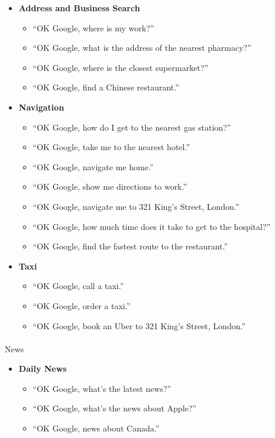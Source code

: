 \documentclass[
  a4paper,
]{article}
\makeatletter
\let\oldparagraph\paragraph
\renewcommand{\paragraph}{
    \@ifstar
      \xxxParagraphStar
      \xxxParagraphNoStar
  }
\newcommand{\xxxParagraphStar}[1]{\oldparagraph*{#1}\mbox{}}
\newcommand{\xxxParagraphNoStar}[1]{\oldparagraph{#1}\mbox{}}
\providecommand{\tightlist}{%
  \setlength{\itemsep}{0pt}\setlength{\parskip}{0pt}}\usepackage{longtable,booktabs,array}
\makeatother
\begin{document}
\begin{itemize}
\tightlist
\item
  \textbf{Address and Business Search}

  \begin{itemize}
  \tightlist
  \item
    ``OK Google, where is my work?''
  \item
    ``OK Google, what is the address of the nearest pharmacy?''
  \item
    ``OK Google, where is the closest supermarket?''
  \item
    ``OK Google, find a Chinese restaurant.''
  \end{itemize}
\item
  \textbf{Navigation}

  \begin{itemize}
  \tightlist
  \item
    ``OK Google, how do I get to the nearest gas station?''
  \item
    ``OK Google, take me to the nearest hotel.''
  \item
    ``OK Google, navigate me home.''
  \item
    ``OK Google, show me directions to work.''
  \item
    ``OK Google, navigate me to 321 King's Street, London.''
  \item
    ``OK Google, how much time does it take to get to the hospital?''
  \item
    ``OK Google, find the fastest route to the restaurant.''
  \end{itemize}
\item
  \textbf{Taxi}

  \begin{itemize}
  \tightlist
  \item
    ``OK Google, call a taxi.''
  \item
    ``OK Google, order a taxi.''
  \item
    ``OK Google, book an Uber to 321 King's Street, London.''
  \end{itemize}
\end{itemize}

\paragraph{News}\label{news}

\begin{itemize}
\tightlist
\item
  \textbf{Daily News}

  \begin{itemize}
  \tightlist
  \item
    ``OK Google, what's the latest news?''
  \item
    ``OK Google, what's the news about Apple?''
  \item
    ``OK Google, news about Canada.''
  \end{itemize}
\end{itemize}
\end{document}
